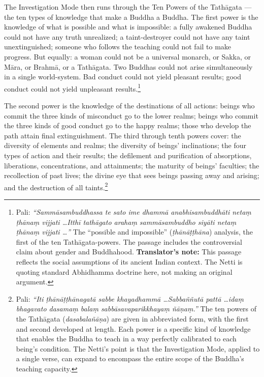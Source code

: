 The Investigation Mode then runs through the Ten Powers of the Tathāgata --- the ten types of knowledge that make a Buddha a Buddha. The first power is the knowledge of what is possible and what is impossible: a fully awakened Buddha could not have any truth unrealized; a taint-destroyer could not have any taint unextinguished; someone who follows the teaching could not fail to make progress. But equally: a woman could not be a universal monarch, or Sakka, or Māra, or Brahmā, or a Tathāgata. Two Buddhas could not arise simultaneously in a single world-system. Bad conduct could not yield pleasant results; good conduct could not yield unpleasant results.\footnote{Pali: \textit{``Sammāsambuddhassa te sato ime dhammā anabhisambuddhāti netaṃ ṭhānaṃ vijjati \ldots Itthī tathāgato arahaṃ sammāsambuddho siyāti netaṃ ṭhānaṃ vijjati \ldots''} The ``possible and impossible'' (\textit{ṭhānāṭṭhāna}) analysis, the first of the ten Tathāgata-powers. The passage includes the controversial claim about gender and Buddhahood. \textbf{Translator's note:} This passage reflects the social assumptions of its ancient Indian context. The Netti is quoting standard Abhidhamma doctrine here, not making an original argument.}

The second power is the knowledge of the destinations of all actions: beings who commit the three kinds of misconduct go to the lower realms; beings who commit the three kinds of good conduct go to the happy realms; those who develop the path attain final extinguishment. The third through tenth powers cover: the diversity of elements and realms; the diversity of beings' inclinations; the four types of action and their results; the defilement and purification of absorptions, liberations, concentrations, and attainments; the maturity of beings' faculties; the recollection of past lives; the divine eye that sees beings passing away and arising; and the destruction of all taints.\footnote{Pali: \textit{``Iti ṭhānāṭṭhānagatā sabbe khayadhammā \ldots Sabbaññutā pattā \ldots idaṃ bhagavato dasamaṃ balaṃ sabbāsavaparikkhayaṃ ñāṇaṃ.''} The ten powers of the Tathāgata (\textit{dasabalañāṇa}) are given in abbreviated form, with the first and second developed at length. Each power is a specific kind of knowledge that enables the Buddha to teach in a way perfectly calibrated to each being's condition. The Netti's point is that the Investigation Mode, applied to a single verse, can expand to encompass the entire scope of the Buddha's teaching capacity.}

